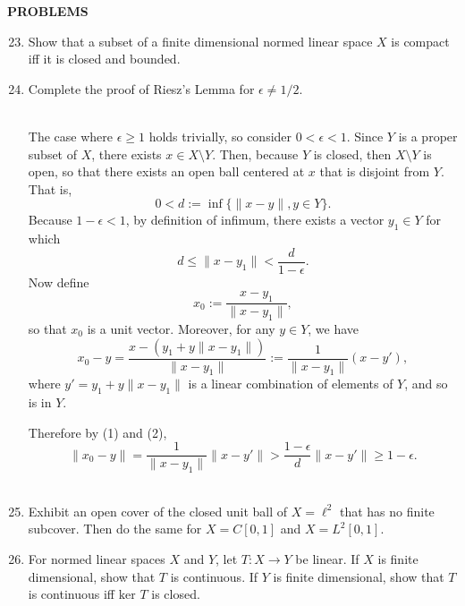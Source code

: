 \begin{center}
	\textbf{PROBLEMS}
\end{center}
\begin{enumerate}
	\setcounter{enumi}{22}
    \item Show that a subset of a finite dimensional normed linear space $X$ is compact iff it is closed and bounded.
    \\\item Complete the proof of Riesz's Lemma for $\epsilon\neq1/2$.
    
    \ \\The case where $\epsilon\ge1$ holds trivially, so consider $0<\epsilon<1$.
    Since $Y$ is a proper subset of $X$, there exists $x\in X\setminus Y$.
    Then, because $Y$ is closed, then $X\setminus Y$ is open, so that there exists an open ball centered at $x$ that is disjoint from $Y$.
    That is, 
    \[
        0<d:=\inf\{\|x-y\|, y\in Y\}.\tag{1}
    \]
    Because $1-\epsilon<1$, by definition of infimum, there exists a vector $y_1\in Y$ for which 
    \[
        d\le\|x-y_1\|<\frac{d}{1-\epsilon}.\tag{2}
    \]
    Now define 
    \[
        x_0:=\frac{x-y_1}{\|x-y_1\|},
    \]
    so that $x_0$ is a unit vector.
    Moreover, for any $y\in Y$, we have
    \[
        x_0-y=\frac{x-(y_1+y\|x-y_1\|)}{\|x-y_1\|}:=\frac{1}{\|x-y_1\|}(x-y'),
    \] 
    where $y'=y_1+y\|x-y_1\|$ is a linear combination of elements of $Y$, and so is in $Y$.
    
    Therefore by (1) and (2),
    \[
        \|x_0-y\|=\frac{1}{\|x-y_1\|}\|x-y'\|>\frac{1-\epsilon}{d}\|x-y'\|\ge1-\epsilon.
    \]
    \\\item Exhibit an open cover of the closed unit ball of $X=\ell^2$ that has no finite subcover.
    Then do the same for $X=C[0,1]$ and $X=L^2[0,1]$.
    \\\item For normed linear spaces $X$ and $Y$, let $T:X\to Y$ be linear.
    If $X$ is finite dimensional, show that $T$ is continuous. 
    If $Y$ is finite dimensional, show that $T$ is continuous iff $\text{ker }T$ is closed.


\end{enumerate}
